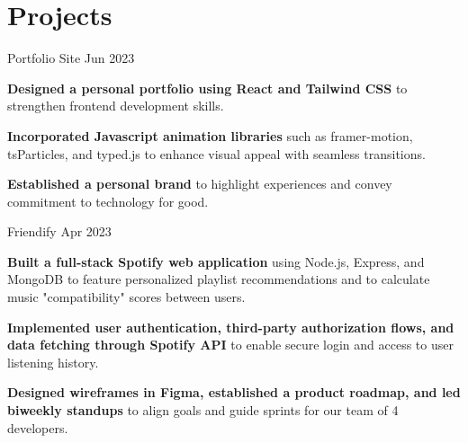 \section{Projects}
\resumeSubHeadingListStart

\resumeProject
{Portfolio Site}
{Jun 2023}
\vspace{0mm}
\resumeItemListStart
\item[\tiny$\bullet$] \textbf{Designed a personal portfolio using React and Tailwind CSS} to strengthen frontend development skills.
\item[\tiny$\bullet$] \textbf{Incorporated Javascript animation libraries} such as framer-motion, tsParticles, and typed.js to enhance visual appeal with seamless transitions.
\item[\tiny$\bullet$] \textbf{Established a personal brand} to highlight experiences and convey commitment to technology for good.
\resumeItemListEnd

\resumeProject
{Friendify}
{Apr 2023}
\vspace{0mm}
\resumeItemListStart
\item[\tiny$\bullet$] \textbf{Built a full-stack Spotify web application} using Node.js, Express, and MongoDB to feature personalized playlist recommendations and to calculate music "compatibility" scores between users.
\item[\tiny$\bullet$] \textbf{Implemented user authentication, third-party authorization flows, and data fetching through Spotify API} to enable secure login and access to user listening history.
\item[\tiny$\bullet$] \textbf{Designed wireframes in Figma, established a product roadmap, and led biweekly standups} to align goals and guide sprints for our team of 4 developers.
\resumeItemListEnd

\resumeSubHeadingListEnd